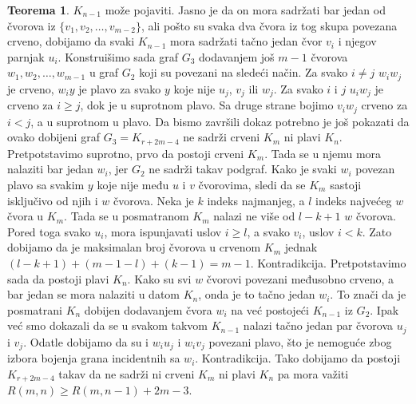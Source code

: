 \documentclass{article}
\theoremstyle{definition}
\newtheorem{teorema}{Teorema}[section]
\begin{document}
\begin{teorema}
{			$K_{n - 1}$ može pojaviti. Jasno je da on mora sadržati bar jedan od čvorova iz $\{v_1, v_2, \dots,v_{m - 2}\}$, ali pošto su svaka dva čvora iz
			tog skupa povezana crveno, dobijamo da svaki $K_{n - 1}$ mora sadržati tačno jedan čvor $v_i$ i njegov parnjak $u_i$. \newline
			Konstruišimo sada graf $G_3$ dodavanjem još $m - 1$ čvorova $w_1, w_2, \dots, w_{m - 1}$ u graf $G_2$ koji su povezani na 						sledeći način. Za svako $i \neq j$ $w_i w_j$ je crveno, $w_i y$ je plavo za svako $y$ koje nije $u_j$, $v_j$ ili $w_j$. Za svako $i$ i $j$ $u_i w_j$
			je crveno za $i \geq j$, dok je u suprotnom plavo. Sa druge strane bojimo $v_i w_j$ crveno za $i < j$, a u suprotnom u plavo. Da bismo završili
			dokaz potrebno je još pokazati da ovako dobijeni graf $G_3 = K_{r + 2m - 4}$ ne sadrži crveni $K_m$ ni plavi $K_n$. \newline
			Pretpotstavimo suprotno, prvo da postoji crveni $K_m$. Tada se u njemu mora nalaziti bar jedan $w_i$, jer $G_2$ ne sadrži takav podgraf. Kako 			je svaki $w_i$ povezan plavo sa svakim $y$ koje nije među $u$ i $v$ čvorovima, sledi da se $K_m$ sastoji isključivo od njih i $w$ čvorova. Neka je
			$k$ indeks najmanjeg, a $l$ indeks najvećeg $w$ čvora u $K_m$. Tada se u posmatranom $K_m$ nalazi ne više od $l - k + 1$ $w$ čvorova.
			Pored toga svako $u_i$, mora ispunjavati uslov $i \geq l$, a svako $v_i$, uslov $i < k$. Zato dobijamo da je maksimalan broj čvorova u crvenom
			$K_m$ jednak $(l - k + 1) + (m - 1 - l) + (k - 1) = m - 1$. Kontradikcija. \newline
			Pretpotstavimo sada da postoji plavi $K_n$. Kako su svi $w$ čvorovi povezani međusobno crveno, a bar jedan se mora nalaziti u datom $K_n$, 
			onda je to tačno jedan $w_i$. To znači da je posmatrani $K_n$ dobijen dodavanjem čvora $w_i$ na već postojeći $K_{n - 1}$ iz $G_2$. Ipak
			već smo dokazali da se u svakom takvom $K_{n - 1}$ nalazi tačno jedan par čvorova $u_j$ i $v_j$. Odatle dobijamo da su i $w_i u_j$ i $w_i v_j$
			povezani plavo, što je nemoguće zbog izbora bojenja grana incidentnih sa $w_i$. Kontradikcija. \newline
			Tako dobijamo da postoji $K_{r + 2m - 4}$ takav da ne sadrži ni crveni $K_m$ ni plavi $K_n$ pa mora važiti $R(m,n) \geq R(m,n-1) + 2m - 3$.
		}
	\end{teorema}
	
	
\end{document}

